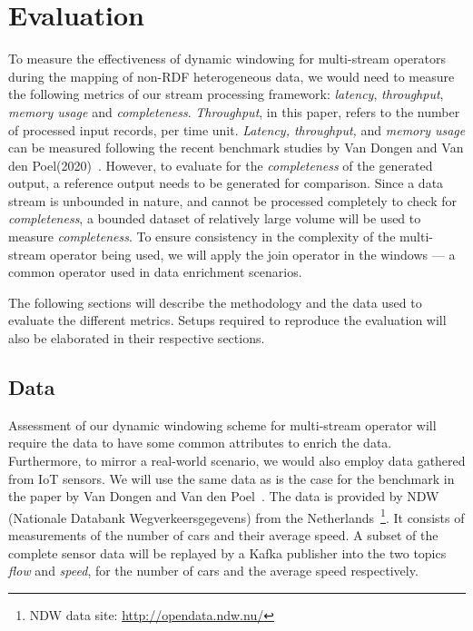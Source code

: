 \chapter{Evaluation}

To measure the effectiveness of dynamic windowing for multi-stream operators during the 
mapping of non-RDF heterogeneous data, we would need to measure the following 
metrics of our stream processing framework: \emph{latency}, \emph{throughput},
\emph{memory usage} and \emph{completeness}. \emph{Throughput}, in this 
paper, refers to the number of processed input records, per time unit.
\emph{Latency, throughput,} and \emph{memory usage} can be measured following the recent benchmark studies by 
Van Dongen and Van den Poel(2020)~\cite{evalution_of_spe}.
However, to evaluate 
for the \emph{completeness}
of the generated output, a reference output needs 
to be generated for comparison. Since a data stream is unbounded in nature, 
and cannot be processed completely to check for \emph{completeness}, a bounded 
dataset of relatively large volume will be used to measure \emph{completeness}.
To ensure consistency in the complexity of the multi-stream operator being used, 
we will apply the join operator in the windows --- a common operator used in 
data enrichment scenarios. 

The following sections will describe the methodology and the data used to evaluate the
different metrics. Setups required to reproduce the evaluation will also be elaborated 
in their respective sections. 


\section{Data}

Assessment of our dynamic windowing scheme for multi-stream operator will require 
the data to have some common attributes to enrich the data. Furthermore, to 
mirror a real-world scenario, we would also employ data gathered from IoT sensors. 
We will use the same data 
as is the case for the benchmark in the paper by Van Dongen and Van den Poel~\cite{evalution_of_spe}. 
The data is provided by NDW (Nationale Databank Wegverkeersgegevens) from the 
Netherlands~\footnote{NDW data site: \href{http://opendata.ndw.nu/}{http://opendata.ndw.nu/} }.
 It consists of measurements of the number of cars and their average speed. 
A subset of the complete sensor data will be replayed by a Kafka publisher into the two topics 
\emph{flow} and \emph{speed}, for the number of cars and the average speed respectively. 

